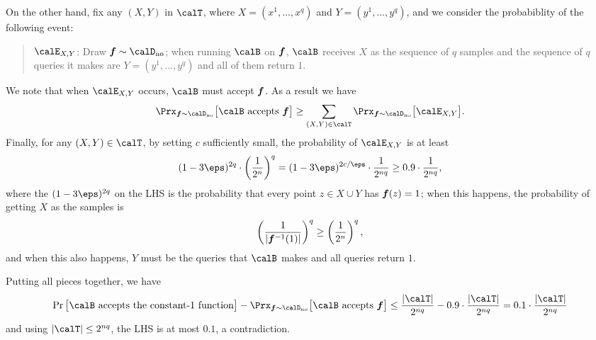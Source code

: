 \documentclass[11pt]{article}
\theoremstyle{definition}
\begin{document}
On the other hand, fix any $(X,Y)$ in $\calT$,
  where $X=(x^1,\ldots,x^q)$ and $Y=(y^1,\ldots,y^q)$, and
we consider the probabiblity of the following event:
\begin{quote}
$\calE_{X,Y}$: Draw $\bff\sim \Dno$; when running 
  $\calB$ on $\boldsymbol{f}$, $\calB$ receives $X$ as the sequence of $q$ samples and the sequence of $q$ queries it makes
  are $Y=(y^1,\ldots,y^q)$ and all of them return $1$.
\end{quote}
We note that when $\calE_{X,Y}$ occurs,   
  $\calB$ must accept $\boldsymbol{f}$.
As a result we have
$$
\Prx_{\bff\sim \Dno} \big[\text{$\calB$ accepts
  $\bff$}\big]\ge \sum_{(X,Y)\in \calT}
\Prx_{\bff\sim \Dno} \big[\calE_{X,Y}\big].
$$
Finally, for any $(X,Y)\in \calT$,
  by setting $c$ sufficiently small, the probability of $\calE_{X,Y}$ is at least $$
(1-3\eps)^{2q}\cdot \left(\frac{1}{2^n}\right)^q=(1-3\eps)^{2c/\eps}\cdot \frac{1}{2^{nq}}\ge 0.9\cdot \frac{1}{2^{nq}},
$$
where the $(1-3\eps)^{2q}$ on the LHS is the probability that every point $z\in X\cup Y$ has $\boldsymbol{f}(z)=1$; when this happens, the probability of getting $X$ as the samples is
$$
\left(\frac{1}{|\boldsymbol{f}^{-1}(1)|}\right)^q\ge \left(\frac{1}{2^n}\right)^q,
$$
and when this also happens, $Y$ must be the queries that $\calB$ makes and all queries return $1$.

Putting all pieces together, we have 
$$
\Pr\big[\text{$\calB$ accepts the constant-$1$ function}\big]-
\Prx_{\bff\sim \Dno} \big[\text{$\calB$ accepts
  $\bff$}\big]\le \frac{|\calT|}{2^{nq}}-0.9\cdot \frac{|\calT|}{2^{nq}}=0.1\cdot \frac{|\calT|}{2^{nq}}
$$
and using $|\calT|\le 2^{nq}$, the LHS is at most
  $0.1$, a contradiction.
\end{document}
